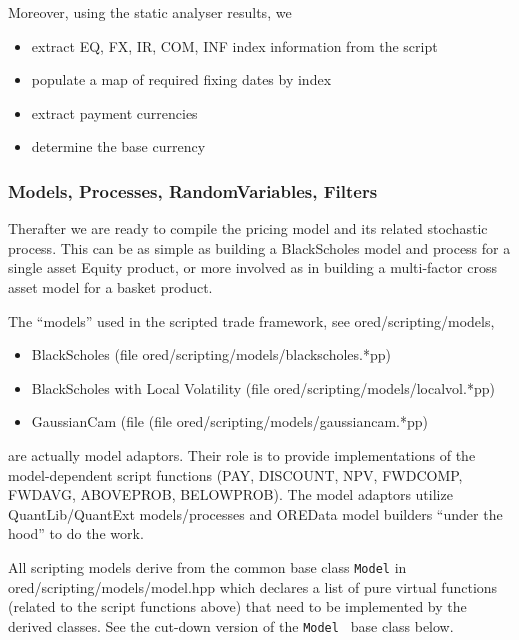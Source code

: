 \documentclass[12pt, a4paper]{report}
\begin{document}
Moreover, using the static analyser results, we
\begin{itemize}
\item extract EQ, FX, IR, COM, INF index information from the script
\item populate a map of required fixing dates by index
\item extract payment currencies 
\item determine the base currency  
\end{itemize}

\subsubsection*{Models, Processes, RandomVariables, Filters}
\label{sec:scriptingmodels}

Therafter we are ready to compile the pricing model and its related stochastic process.
This can be as simple as building a BlackScholes model and process for a single asset Equity product,
or more involved as in building a multi-factor cross asset model for a basket product.

The ``models'' used in the scripted trade framework, see ored/scripting/models,
\begin{itemize}
\item BlackScholes (file ored/scripting/models/blackscholes.*pp)
\item BlackScholes with Local Volatility (file ored/scripting/models/localvol.*pp)
\item GaussianCam (file (file ored/scripting/models/gaussiancam.*pp)
\end{itemize}
are actually model adaptors. Their role is to provide implementations of the model-dependent script
functions (PAY, DISCOUNT, NPV, FWDCOMP, FWDAVG, ABOVEPROB, BELOWPROB). The model adaptors
utilize QuantLib/QuantExt models/processes and OREData model builders ``under the hood'' to do the
work. 

All scripting models derive from the common base class {\tt Model} in ored/scripting/models/model.hpp
which declares a list of pure virtual functions (related to the script functions above) that need to be
implemented by the derived classes. See the cut-down version of the {\tt Model } base class below.
\end{document}
